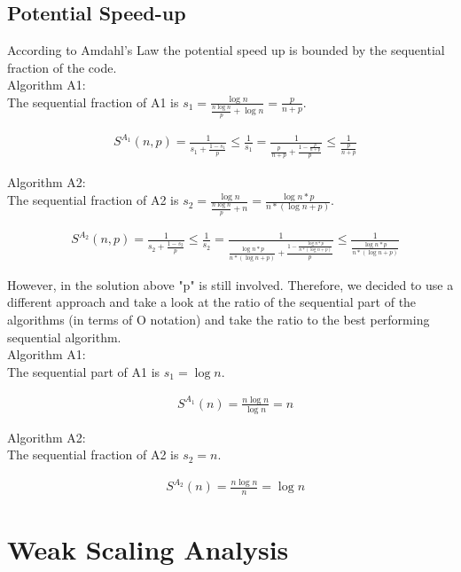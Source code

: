 \documentclass[a4paper,%
11pt,%
DIV12,
headsepline,%
headings=normal,
]{scrartcl}
\begin{document}
\subsection{Potential Speed-up}

According to Amdahl's Law the potential speed up is bounded by the sequential fraction of the code.\\
\newpage
Algorithm A1:\\
The sequential fraction of A1 is $s_1 = \frac{\log n}{\frac{n \log n}{p} + \log n} = \frac{p}{n+p}$.

\begin{align*}
    &S^{A_1}(n,p) = \frac{1}{s_1 + \frac{1-s_1}{p}} \leq \frac{1}{s_1} = \frac{1}{\frac{p}{n+p} + \frac{1-\frac{p}{n+p}}{p}} \leq \frac{1}{\frac{p}{n+p}}
\end{align*}

Algorithm A2:\\
The sequential fraction of A2 is $s_2 = \frac{\log n}{\frac{n \log n}{p} + n} = \frac{\log n * p}{n*(\log n + p)}$.

\begin{align*}
    &S^{A_2}(n,p) = \frac{1}{s_2 + \frac{1-s_2}{p}} \leq \frac{1}{s_2} = \frac{1}{\frac{\log n * p}{n*(\log n + p)} + \frac{1-\frac{\log n * p}{n*(\log n + p)}}{p}} \leq \frac{1}{\frac{\log n * p}{n*(\log n + p)}}
\end{align*}

However, in the solution above "p" is still involved. Therefore, we decided to use a different approach and take a look at the ratio of the sequential part of the algorithms (in terms of O notation) and take the ratio to the best performing sequential algorithm.\\

Algorithm A1:\\
The sequential part of A1 is $s_1 = \log n$.

\begin{align*}
    &S^{A_1}(n) = \frac{n \log n}{\log n} = n
\end{align*}


Algorithm A2:\\
The sequential fraction of A2 is $s_2 = n$.

\begin{align*}
    &S^{A_2}(n) = \frac{n \log n}{n} = \log n
\end{align*}

\section{Weak Scaling Analysis}
\end{document}
